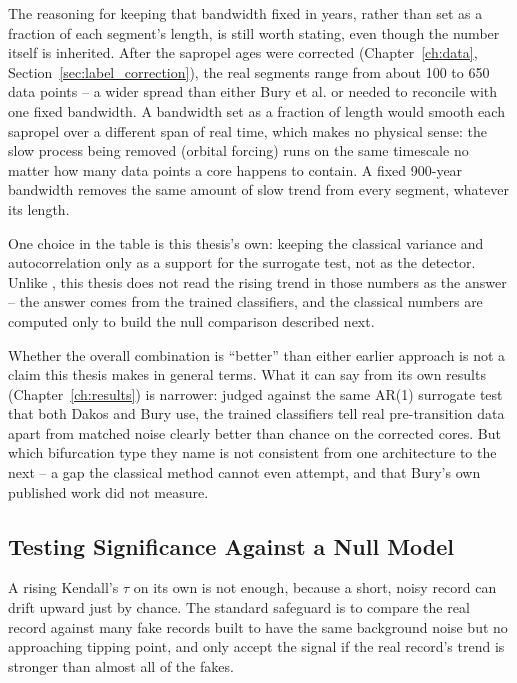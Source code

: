 The reasoning for keeping that bandwidth fixed in years, rather than set as a fraction of each segment's length, is still worth stating, even though the number itself is inherited. After the sapropel ages were corrected (Chapter~\ref{ch:data}, Section~\ref{sec:label_correction}), the real segments range from about 100 to 650 data points -- a wider spread than either Bury et al. or \citet{dakos2012} needed to reconcile with one fixed bandwidth. A bandwidth set as a fraction of length would smooth each sapropel over a different span of real time, which makes no physical sense: the slow process being removed (orbital forcing) runs on the same timescale no matter how many data points a core happens to contain. A fixed 900-year bandwidth removes the same amount of slow trend from every segment, whatever its length.

One choice in the table is this thesis's own: keeping the classical variance and autocorrelation only as a support for the surrogate test, not as the detector. Unlike \citet{dakos2012}, this thesis does not read the rising trend in those numbers as the answer -- the answer comes from the trained classifiers, and the classical numbers are computed only to build the null comparison described next.

Whether the overall combination is ``better'' than either earlier approach is not a claim this thesis makes in general terms. What it can say from its own results (Chapter~\ref{ch:results}) is narrower: judged against the same AR(1) surrogate test that both Dakos and Bury use, the trained classifiers tell real pre-transition data apart from matched noise clearly better than chance on the corrected cores. But which bifurcation type they name is not consistent from one architecture to the next -- a gap the classical method cannot even attempt, and that Bury's own published work did not measure.

\subsection{Testing Significance Against a Null Model}
\label{sec:ar1_surrogates}
A rising Kendall's $\tau$ on its own is not enough, because a short, noisy record can drift upward just by chance. The standard safeguard is to compare the real record against many fake records built to have the same background noise but no approaching tipping point, and only accept the signal if the real record's trend is stronger than almost all of the fakes.


